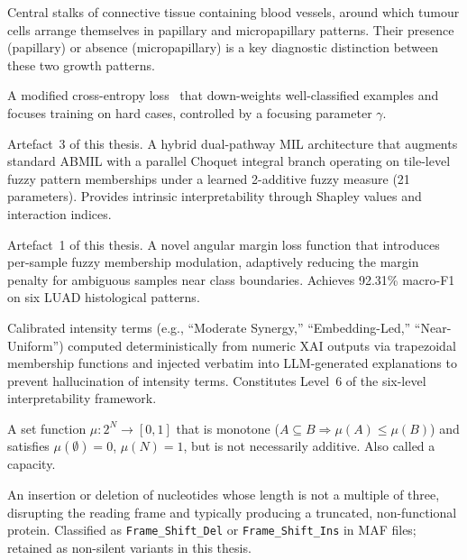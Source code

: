 \begin{description}[style=nextline,leftmargin=4cm]
\item[Fibrovascular cores] Central stalks of connective tissue containing blood vessels, around which tumour cells arrange themselves in papillary and micropapillary patterns.  Their presence (papillary) or absence (micropapillary) is a key diagnostic distinction between these two growth patterns.


\item[Focal loss] A modified cross-entropy loss~\cite{lin2017focal} that down-weights well-classified examples and focuses training on hard cases, controlled by a focusing parameter $\gamma$.


\item[FC-MIL (Fuzzy Choquet MIL)] Artefact~3 of this thesis.  A hybrid dual-pathway MIL architecture that augments standard ABMIL with a parallel Choquet integral branch operating on tile-level fuzzy pattern memberships under a learned 2-additive fuzzy measure (21 parameters).  Provides intrinsic interpretability through Shapley values and interaction indices.

\item[FuzzyArcLoss V2] Artefact~1 of this thesis.  A novel angular margin loss function that introduces per-sample fuzzy membership modulation, adaptively reducing the margin penalty for ambiguous samples near class boundaries.  Achieves 92.31\% macro-F1 on six LUAD histological patterns.

\item[Fuzzy linguistic labels] Calibrated intensity terms (e.g., ``Moderate Synergy,'' ``Embedding-Led,'' ``Near-Uniform'') computed deterministically from numeric XAI outputs via trapezoidal membership functions and injected verbatim into LLM-generated explanations to prevent hallucination of intensity terms.  Constitutes Level~6 of the six-level interpretability framework.

\item[Fuzzy measure] A set function $\mu: 2^N \to [0,1]$ that is monotone ($A \subseteq B \Rightarrow \mu(A) \leq \mu(B)$) and satisfies $\mu(\emptyset) = 0$, $\mu(N) = 1$, but is not necessarily additive.  Also called a capacity.


\item[Frameshift mutation] An insertion or deletion of nucleotides whose length is not a multiple of three, disrupting the reading frame and typically producing a truncated, non-functional protein.  Classified as \texttt{Frame\_Shift\_Del} or \texttt{Frame\_Shift\_Ins} in MAF files; retained as non-silent variants in this thesis.



\end{description}
